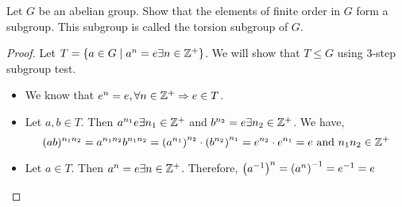 \begin{exercise}
    Let $G$ be an abelian group. Show that the elements of finite order in $G$ form a subgroup. This subgroup is called the torsion subgroup of $G$.
\end{exercise}

\begin{proof}
    Let $T = \qty{a \in G \mid a^n = e \exists n \in \mathbb{Z}^+}$. We will show that $T \leq G$ using 3-step subgroup test.
    
    \begin{itemize}
        \item   We know that $e^n = e, \forall n \in \mathbb{Z}^+ \Rightarrow e \in T$. 
        \item Let $a, b \in T$. Then $a^{n_1} e \exists n_1 \in \mathbb{Z}^+$ and $b^{n_2} = e \exists n_2 \in \mathbb{Z}^+$. We have,
        \[ (ab)^{n_1n_2} = a^{n_1n_2}b^{n_1n_2} = \qty(a^{n_1})^{n_2} \cdot \qty(b^{n_2})^{n_1} = e^{n_2} \cdot e^{n_1} = e \text{ and } n_1n_2 \in \mathbb{Z}^+\]
        \item Let $a \in T$. Then $a^n = e \exists n \in \mathbb{Z}^+$. Therefore, $\qty(a^{-1})^n = \qty(a^n)^{-1} = e^{-1} = e $
    \end{itemize}

\end{proof}